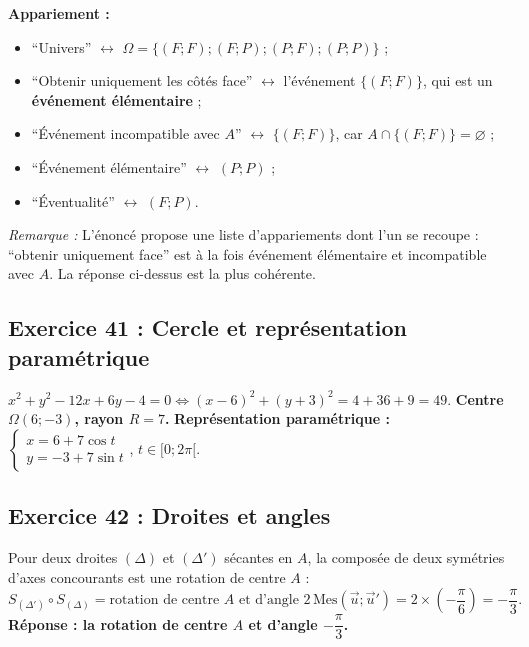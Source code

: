 \documentclass[11pt,a4paper]{article}
\newcommand{\vect}[1]{\overrightarrow{#1}}
\newenvironment{rem}{\par\medskip\noindent\textit{Remarque :}\quad}{\par\medskip}
\begin{document}
\textbf{Appariement :}
\begin{itemize}
  \item ``Univers'' $\longleftrightarrow$ $\Omega=\{(F;F);(F;P);(P;F);(P;P)\}$ ;
  \item ``Obtenir uniquement les c\^ot\'es face'' $\longleftrightarrow$ l'\'ev\'enement $\{(F;F)\}$, qui est un \textbf{\'ev\'enement \'el\'ementaire} ;
  \item ``\'Ev\'enement incompatible avec $A$'' $\longleftrightarrow$ $\{(F;F)\}$, car $A\cap\{(F;F)\}=\varnothing$ ;
  \item ``\'Ev\'enement \'el\'ementaire'' $\longleftrightarrow$ $(P;P)$ ;
  \item ``\'Eventualit\'e'' $\longleftrightarrow$ $(F;P)$.
\end{itemize}
\begin{rem} L'\'enonc\'e propose une liste d'appariements dont l'un se recoupe : ``obtenir uniquement face'' est \`a la fois
\'ev\'enement \'el\'ementaire et incompatible avec $A$. La r\'eponse ci-dessus est la plus coh\'erente.\end{rem}

\subsection{Exercice 41 : Cercle et repr\'esentation param\'etrique}

$x^2+y^2-12x+6y-4=0\iff(x-6)^2+(y+3)^2=4+36+9=49$.
\textbf{Centre $\Omega(6;-3)$, rayon $R=7$.}
\textbf{Repr\'esentation param\'etrique :} $\begin{cases}x=6+7\cos t\\ y=-3+7\sin t\end{cases}$, $t\in[0;2\pi[$.

\subsection{Exercice 42 : Droites et angles}

Pour deux droites $(\Delta)$ et $(\Delta')$ s\'ecantes en $A$, la compos\'ee de deux sym\'etries d'axes concourants est une rotation de centre $A$ :
\[
S_{(\Delta')}\circ S_{(\Delta)}=\text{rotation de centre }A\text{ et d'angle }2\,\mathrm{Mes}(\vect u;\vect u')
=2\times\left(-\frac{\pi}{6}\right)=-\frac{\pi}{3}.
\]
\textbf{R\'eponse : la rotation de centre $A$ et d'angle $-\dfrac{\pi}{3}$.}
\end{document}
